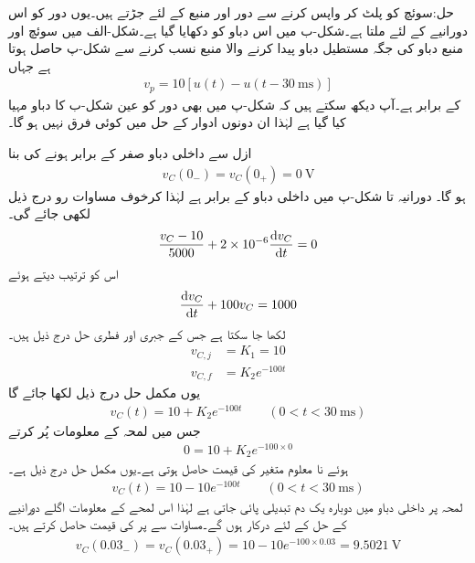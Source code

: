 حل:سوئچ کو پلٹ کر واپس کرنے سے دور اور منبع  کے لئے جڑتے ہیں۔یوں دور کو اس دورانیے کے لئے  ملتا ہے۔شکل-ب میں اس دباو کو دکھایا گیا ہے۔شکل-الف میں سوئچ اور منبع دباو کی جگہ مستطیل  دباو پیدا کرنے والا منبع  نسب کرنے سے شکل-پ حاصل ہوتا ہے جہاں
\begin{align*}
v_p=10\left[u(t)-u(t-\SI{30}{\milli\second})\right]
\end{align*}
کے برابر ہے۔آپ دیکھ سکتے ہیں کہ شکل-پ میں بھی دور کو عین شکل-ب کا دباو مہیا کیا گیا ہے لہٰذا ان دونوں ادوار کے حل میں کوئی فرق نہیں ہو گا۔

ازل سے داخلی دباو صفر کے برابر ہونے کی بنا 
\begin{align*}
v_C(0_-)=v_C(0_+)=\SI{0}{\volt}
\end{align*}
ہو گا۔ دورانیہ  تا شکل-پ  میں داخلی دباو  کے برابر ہے لہٰذا کرخوف مساوات رو درج ذیل لکھی جائے گی۔
\begin{align*}
\frac{v_C-10}{5000}+2\times 10^{-6}\frac{\dif v_C}{\dif t}=0
\end{align*}
اس کو ترتیب دیتے ہوئے
\begin{align*}
\frac{\dif v_C}{\dif t}+100 v_C=1000
\end{align*}
لکھا جا سکتا ہے جس کے جبری اور فطری حل درج ذیل ہیں۔
\begin{align*}
v_{C,j}&=K_1=10\\
v_{C,f}&=K_2 e^{-100t}
\end{align*}
یوں مکمل حل درج ذیل لکھا جائے گا
\begin{align*}
v_C(t)=10+K_2e^{-100t}\quad \quad (0<t<\SI{30}{\milli\second})
\end{align*}
جس میں لمحہ  کے معلومات پُر کرتے
\begin{align*}
0=10+K_2 e^{-100\times 0}
\end{align*}
ہوئے نا معلوم متغیر کی قیمت  حاصل ہوتی ہے۔یوں مکمل حل درج ذیل ہے۔
\begin{align}\label{مساوات_عارضی_مستطیل_مثال_حل_الف}
v_C(t)=10-10e^{-100t}\quad \quad (0<t<\SI{30}{\milli\second})
\end{align}
لمحہ  پر داخلی دباو میں دوبارہ یک دم تبدیلی پائی جاتی ہے لہٰذا اس لمحے کے معلومات اگلے دورانیے کے حل کے لئے درکار ہوں گے۔مساوات  سے  پر  کی قیمت حاصل کرتے ہیں۔
\begin{align*}
v_C(0.03_-)=v_C(0.03_+)=10-10e^{-100\times 0.03}=\SI{9.5021}{\volt}
\end{align*} 
